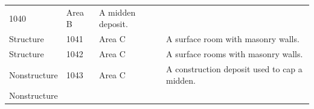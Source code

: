 \documentclass[
  12pt,
]{krantz}
\begin{document}
\begin{longtable}[]{@{}llll@{}}
\begin{minipage}[t]{0.11\columnwidth}
1040\strut
\end{minipage} & \begin{minipage}[t]{0.16\columnwidth}\raggedright
Area B\strut
\end{minipage} & \begin{minipage}[t]{0.38\columnwidth}\raggedright
A midden deposit.\strut
\end{minipage}\tabularnewline
\begin{minipage}[t]{0.18\columnwidth}\raggedright
Structure\strut
\end{minipage} & \begin{minipage}[t]{0.11\columnwidth}\raggedright
1041\strut
\end{minipage} & \begin{minipage}[t]{0.16\columnwidth}\raggedright
Area C\strut
\end{minipage} & \begin{minipage}[t]{0.38\columnwidth}\raggedright
A surface room with masonry
walls.\strut
\end{minipage}\tabularnewline
\begin{minipage}[t]{0.18\columnwidth}\raggedright
Structure\strut
\end{minipage} & \begin{minipage}[t]{0.11\columnwidth}\raggedright
1042\strut
\end{minipage} & \begin{minipage}[t]{0.16\columnwidth}\raggedright
Area C\strut
\end{minipage} & \begin{minipage}[t]{0.38\columnwidth}\raggedright
A surface rooms with masonry
walls.\strut
\end{minipage}\tabularnewline
\begin{minipage}[t]{0.18\columnwidth}\raggedright
Nonstructure\strut
\end{minipage} & \begin{minipage}[t]{0.11\columnwidth}\raggedright
1043\strut
\end{minipage} & \begin{minipage}[t]{0.16\columnwidth}\raggedright
Area C\strut
\end{minipage} & \begin{minipage}[t]{0.38\columnwidth}\raggedright
A construction deposit used
to cap a midden.\strut
\end{minipage}\tabularnewline
\begin{minipage}[t]{0.18\columnwidth}\raggedright
Nonstructure\strut
\end{minipage} & \begin{minipage}[t]{0.11\columnwidth}\raggedright

\end{minipage}
\end{longtable}
\end{document}
